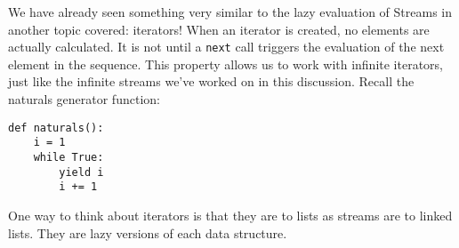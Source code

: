 We have already seen something very similar to the lazy evaluation of Streams in
another topic covered: iterators! When an iterator is created, no elements are
actually calculated. It is not until a \texttt{next} call triggers the
evaluation of the next element in the sequence. This property allows us to work
with infinite iterators, just like the infinite streams we've worked on in this
discussion. Recall the naturals generator function:

\begin{lstlisting}
def naturals():
    i = 1
    while True:
        yield i
        i += 1
\end{lstlisting}

One way to think about iterators is that they are to lists as streams are to
linked lists. They are lazy versions of each data structure.
